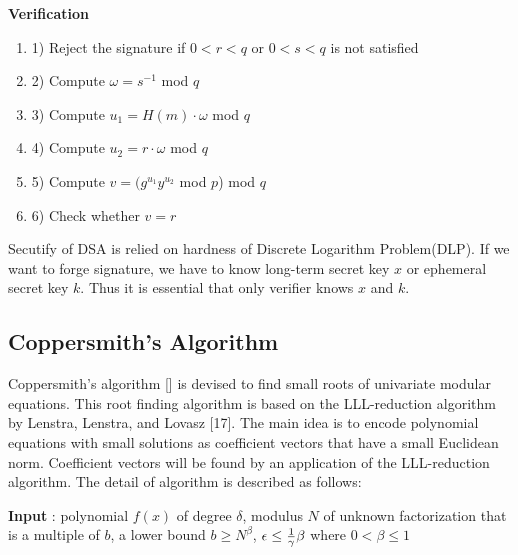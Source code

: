 \documentclass[a4paper]{article}
\begin{document}
\textbf{Verification}
\begin{enumerate}[label=]
      \item 1) Reject the signature if $0<r<q$ or $0<s<q$ is not satisfied
      \item 2) Compute $\omega = s^{-1}$ mod $q$
      \item 3) Compute $u_1 = H(m) \cdot \omega$ mod $q$
      \item 4) Compute $u_2 = r \cdot \omega$ mod $q$
      \item 5) Compute $v=(g^{u_1} y^{u_2}$ mod $p$) mod $q$
      \item 6) Check whether $v = r$
\end{enumerate} 

Secutify of DSA is relied on hardness of Discrete Logarithm Problem(DLP). If we want to forge signature, we have to know long-term secret key $x$ or ephemeral secret key $k$. Thus it is essential that only verifier knows $x$ and $k$.

\subsection{Coppersmith's Algorithm}
Coppersmith's algorithm [] is devised to find small roots of univariate modular equations. This root finding algorithm is based on the LLL-reduction algorithm by Lenstra, Lenstra, and Lovasz [17]. The main idea is to encode polynomial equations with small solutions as coefficient vectors that have a small Euclidean norm. Coefficient vectors will be found by an application of the LLL-reduction algorithm.
The detail of algorithm is described as follows:

\textbf{Input} : polynomial $f(x)$ of degree $\delta$, modulus $N$ of unknown factorization that is a multiple of $b$, a lower bound $b \geq N^{\beta}$, $\epsilon \leq {1 \over \gamma} \beta$ where $0<\beta \leq 1$
\\
\end{document}
